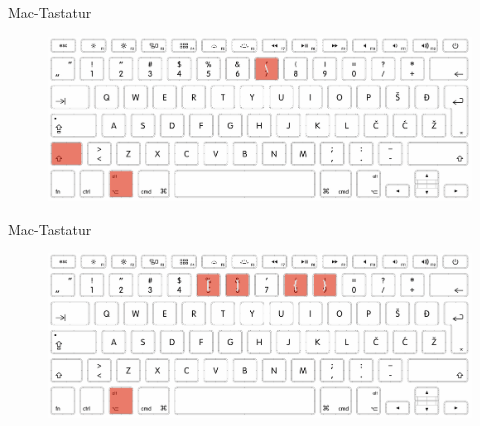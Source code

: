\begin{frame}[c]{Mac-Tastatur}
	\begin{figure}[htbp]
\centering
\includegraphics[width=1.0\textwidth]{img/tastatur/tastatur_mac_shift.png}
\end{figure}
\end{frame}


\begin{frame}[c]{Mac-Tastatur}
	\begin{figure}[htbp]
\centering
\includegraphics[width=1.0\textwidth]{img/tastatur/tastatur_mac_alt.png}
\end{figure}
\end{frame}

